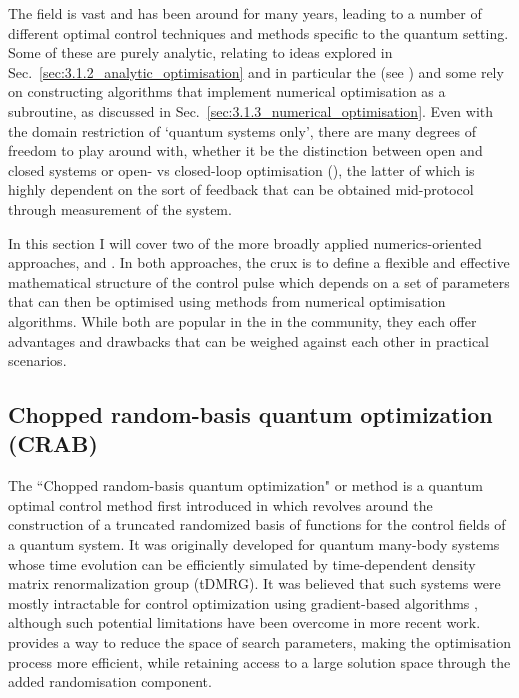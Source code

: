 The  field is vast and has been around for many years, leading to a number of different optimal control techniques and methods specific to the quantum setting. Some of these are purely analytic, relating to ideas  explored in Sec.~\ref{sec:3.1.2_analytic_optimisation} and in particular the  (see ) and some rely on constructing algorithms that implement numerical optimisation as a subroutine, as discussed in Sec.~\ref{sec:3.1.3_numerical_optimisation}. Even with the domain restriction of `quantum systems only', there are many degrees of freedom to play around with, whether it be the distinction between open and closed systems  or open- vs closed-loop optimisation (), the latter of which is highly dependent on the sort of feedback that can be obtained mid-protocol through measurement of the system.

In this section I will cover two of the more broadly applied numerics-oriented approaches,  and . In both approaches, the crux is to define a flexible and effective mathematical structure of the control pulse which depends on a set of parameters that can then be optimised using methods from numerical optimisation algorithms. While both are popular in the in the  community, they each offer advantages and drawbacks that can be weighed against each other in practical scenarios. 

\subsection{Chopped random-basis quantum optimization (CRAB)}\label{sec:3.3.1_CRAB}

The ``Chopped random-basis quantum optimization" or  method is a quantum optimal control method first introduced in \cite{doria_optimal_2011, caneva_chopped_2011} which revolves around the construction of a truncated randomized basis of functions for the control fields of a quantum system. It was originally developed for quantum many-body systems whose time evolution can be efficiently simulated by time-dependent density matrix renormalization group (tDMRG)\cite{white_density_1992, schollwock_density-matrix_2005, schollwock_density-matrix_2011}. It was believed that such systems were mostly intractable for control optimization using gradient-based algorithms \cite{brif_control_2010}, although such potential limitations have been overcome in more recent work\cite{jensen_approximate_2021}.  provides a way to reduce the space of search parameters, making the optimisation process more efficient, while retaining access to a large solution space through the added randomisation component.

